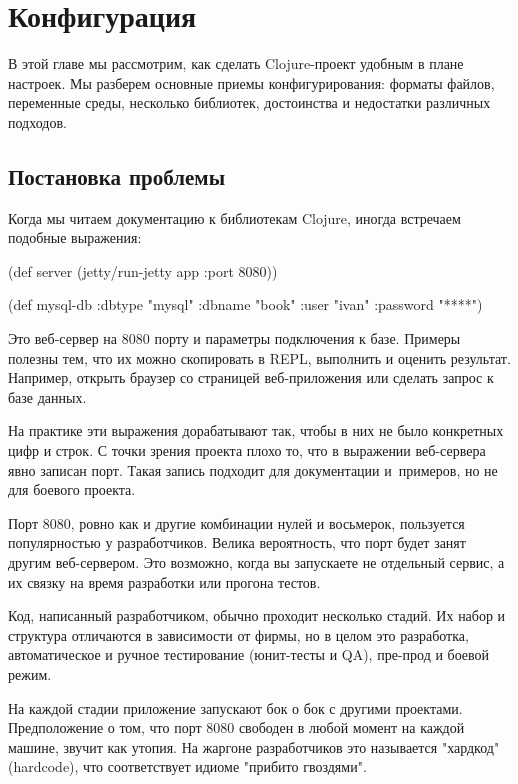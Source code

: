 \chapter{Конфигурация}

В этой главе мы рассмотрим, как сделать Clojure-проект удобным в плане
настроек. Мы разберем основные приемы конфигурирования: форматы файлов,
переменные среды, несколько библиотек, достоинства и недостатки различных
подходов.

\section{Постановка проблемы}

Когда мы читаем документацию к библиотекам Clojure, иногда встречаем подобные
выражения:

\begin{code}
(def server
  (jetty/run-jetty app {:port 8080}))

(def mysql-db
  {:dbtype   "mysql"
   :dbname   "book"
   :user     "ivan"
   :password "****"})
\end{code}

Это веб-сервер на 8080 порту и параметры подключения к базе. Примеры полезны
тем, что их можно скопировать в REPL, выполнить и оценить результат. Например,
открыть браузер со страницей веб-приложения или сделать запрос к базе данных.

На практике эти выражения дорабатывают так, чтобы в них не было конкретных цифр
и строк. С точки зрения проекта плохо то, что в выражении веб-сервера явно
записан порт. Такая запись подходит для документации и~примеров, но не для
боевого проекта.

Порт 8080, ровно как и другие комбинации нулей и восьмерок, пользуется
популярностью у разработчиков. Велика вероятность, что порт будет занят другим
веб-сервером. Это возможно, когда вы запускаете не отдельный сервис, а их связку
на время разработки или прогона тестов.

Код, написанный разработчиком, обычно проходит несколько стадий. Их набор и
структура отличаются в зависимости от фирмы, но в целом это разработка,
автоматическое и ручное тестирование (юнит-тесты и QA), пре-прод и боевой режим.

На каждой стадии приложение запускают бок о бок с другими
проектами. Предположение о том, что порт 8080 свободен в любой момент на каждой
машине, звучит как утопия. На жаргоне разработчиков это называется "хардкод"
(hardcode), что соответствует идиоме "прибито гвоздями".

